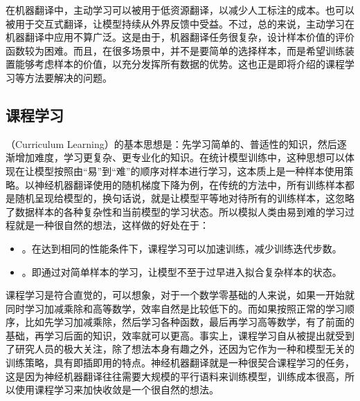 \parinterval 在机器翻译中，主动学习可以被用于低资源翻译，以减少人工标注的成本。也可以被用于交互式翻译，让模型持续从外界反馈中受益。不过，总的来说，主动学习在机器翻译中应用不算广泛。这是由于，机器翻译任务很复杂，设计样本价值的评价函数较为困难。而且，在很多场景中，并不是要简单的选择样本，而是希望训练装置能够考虑样本的价值，以充分发挥所有数据的优势。这也正是即将介绍的课程学习等方法要解决的问题。


\subsection{课程学习}
\label{sec:curriculum-learning}

（Curriculum Learning）的基本思想是：先学习简单的、普适性的知识，然后逐渐增加难度，学习更复杂、更专业化的知识。在统计模型训练中，这种思想可以体现在让模型按照由“易”到“难”的顺序对样本进行学习，这本质上是一种样本使用策略。以神经机器翻译使用的随机梯度下降为例，在传统的方法中，所有训练样本都是随机呈现给模型的，换句话说，就是让模型平等地对待所有的训练样本，这忽略了数据样本的各种复杂性和当前模型的学习状态。所以模拟人类由易到难的学习过程就是一种很自然的想法，这样做的好处在于：

\begin{itemize}
\vspace{0.5em}
\item {\small{}}。在达到相同的性能条件下，课程学习可以加速训练，减少训练迭代步数。
\vspace{0.5em}
\item {\small{}}。即通过对简单样本的学习，让模型不至于过早进入拟合复杂样本的状态。
\vspace{0.5em}
\end{itemize}

\parinterval 课程学习是符合直觉的，可以想象，对于一个数学零基础的人来说，如果一开始就同时学习加减乘除和高等数学，效率自然是比较低下的。而如果按照正常的学习顺序，比如先学习加减乘除，然后学习各种函数，最后再学习高等数学，有了前面的基础，再学习后面的知识，效率就可以更高。事实上，课程学习自从被提出就受到了研究人员的极大关注，除了想法本身有趣之外，还因为它作为一种和模型无关的训练策略，具有即插即用的特点。神经机器翻译就是一种很契合课程学习的任务，这是因为神经机器翻译往往需要大规模的平行语料来训练模型，训练成本很高，所以使用课程学习来加快收敛是一个很自然的想法。

